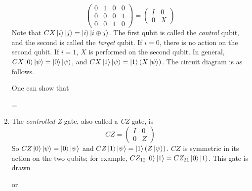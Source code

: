 \begin{enumerate}
\[\begin{pmatrix}
        0 & 1 & 0 & 0 \\
        0 & 0 & 0 & 1 \\
        0 & 0 & 1 & 0
    \end{pmatrix} = \begin{pmatrix}
        I & 0 \\
        0 & X
    \end{pmatrix} \]
    Note that \( CX \ket{i} \ket{j} = \ket{i}\ket{i \oplus j} \).
    The first qubit is called the \emph{control} qubit, and the second is called the \emph{target} qubit.
    If \( i = 0 \), there is no action on the second qubit.
    If \( i = 1 \), \( X \) is performed on the second qubit.
    In general, \( CX \ket{0}\ket{\psi} = \ket{0}\ket{\psi} \), and \( CX \ket{1}\ket{\psi} = \ket{1}(X \ket{\psi}) \).
    The circuit diagram is as follows.
    \begin{center}
        \leavevmode
    \end{center}
    One can show that
    \begin{center}
        \leavevmode
        \quad = \quad
    \end{center}
    \item The \emph{controlled-Z} gate, also called a \emph{CZ} gate, is
    \[ CZ = \begin{pmatrix}
        I & 0 \\
        0 & Z
    \end{pmatrix} \]
    So \( CZ \ket{0}\ket{\psi} = \ket{0}\ket{\psi} \) and \( CZ \ket{1}\ket{\psi} = \ket{1}(Z\ket{\psi}) \).
    \( CZ \) is symmetric in its action on the two qubits; for example, \( CZ_{12} \ket{0} \ket{1} = CZ_{21} \ket{0} \ket{1} \).
    This gate is drawn
    \begin{center}
        \leavevmode
        \quad or \quad
    \end{center}
\end{enumerate}


